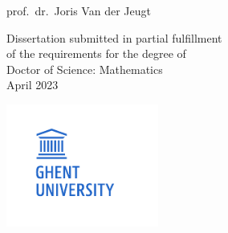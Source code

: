 \begin{titlepage}
\begin{center}
\begin{minipage}{45mm}
            prof.\ dr.\ Joris Van der Jeugt
        \end{minipage}
    \end{center}

    \vfill

    \begin{flushleft}
        Dissertation submitted in partial fulfillment\\
        of the requirements for the degree of \\
        Doctor of Science: Mathematics\\\vspace{3mm}
        April 2023
    \end{flushleft}

    \vspace{0cm}

    \begin{center}
    \end{center}

    \begin{minipage}{5cm}
        \hspace{-1cm}\includegraphics[width=5cm]{img/logo_ugent.pdf}
    \end{minipage}%
    \hfill%

\end{titlepage}
\restoregeometry
